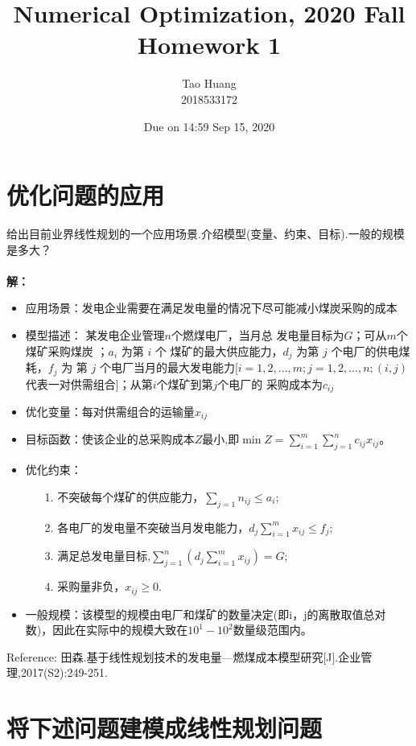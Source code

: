 \documentclass[10pt]{article}
\begin{document}
	
\title{	Numerical Optimization, 2020 Fall\\Homework 1}
\author{Tao Huang\\2018533172}
\date{Due on 14:59 Sep 15, 2020
	}
\maketitle

\section{优化问题的应用}
\Large{给出目前业界线性规划的一个应用场景.介绍模型(变量、约束、目标).一般的规模是多大？}\\\\
\Large{\textbf{解：}}
\begin{itemize}
\item 应用场景：发电企业需要在满足发电量的情况下尽可能减小煤炭采购的成本
\item 模型描述： 某发电企业管理$n$个燃煤电厂，当月总
发电量目标为$ G $；可从$ m $个煤矿采购煤炭 ；$a_i$ 为第 $i$ 个
煤矿的最大供应能力，$d_j$ 为第 $j$ 个电厂的供电煤耗，$f_j$ 为
第 $j$ 个电厂当月的最大发电能力[$i=1,2,...,m;j=1,2,...,n;
(i, j)$ 代表一对供需组合]；从第$ i $个煤矿到第$ j $个电厂的
采购成本为$ c_{ij}$
\item 优化变量：每对供需组合的运输量$x_{ij}$
\item 目标函数：使该企业的总采购成本$Z$最小,即$\min Z=\sum_{i=1}^m\sum_{j=1}^n c_{ij}x_{ij}$。
\item 优化约束：
\begin{itemize}
\item [1.] 不突破每个煤矿的供应能力，$\sum_{j=1}n_{ij}\le a_i$;
\item [2.] 各电厂的发电量不突破当月发电能力，$d_j\sum_{i=1}^mx_{ij}\le f_j$;
\item [3.] 满足总发电量目标,$\sum_{j=1}^n(d_j\sum_{i=1}^mx_{ij})=G$;
\item [4.] 采购量非负，$x_{ij}\ge 0$.
\end{itemize}
\item 一般规模：该模型的规模由电厂和煤矿的数量决定(即i，j的离散取值总对数)，因此在实际中的规模大致在$10^1-10^2$数量级范围内。
\end{itemize}
Reference: 田森.基于线性规划技术的发电量—燃煤成本模型研究[J].企业管理,2017(S2):249-251.
\section{将下述问题建模成线性规划问题} 
\end{document}
